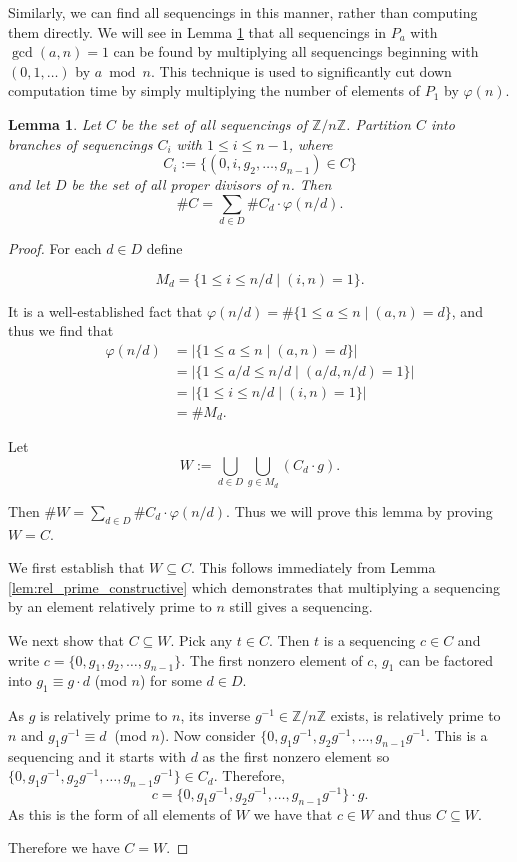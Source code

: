 \documentclass[12pt]{article}
\theoremstyle{plain}
\newtheorem{lemma}[theorem]{Lemma}
\theoremstyle{definition}
\theoremstyle{remark}
\newcommand{\ZZ}{\mathbb{Z}}
\begin{document}
Similarly, we can find all sequencings in this manner, rather than computing them directly. We will see in Lemma \ref{lem:branch} that all sequencings in $P_a$ with $\gcd(a,n)=1$ can be found by multiplying all sequencings beginning with $(0,1,\ldots)$ by $a\bmod{n}$. This technique is used to significantly cut down computation time by simply multiplying the number of elements of $P_1$ by $\varphi(n)$.

\begin{lemma}\label{lem:branch}
Let $C$ be the set of all sequencings of $\ZZ / n\ZZ$. Partition $C$ into branches of sequencings $C_i$ with $1\leq i\leq n-1$, where
\[C_i:= \{(0,i,g_2,\ldots,g_{n-1})\in C \}\]
and let $D$ be the set of all proper divisors of $n$. Then \[\#C = \sum_{d\in D}\#C_d\cdot \varphi(n/d).\]
\end{lemma}


\begin{proof}

For each $d\in D$ define

\[
M_d = \{1 \leq i \leq n/d \mid (i,n)=1\}.
\]

It is a well-established fact that $\varphi(n/d) = \#\{1 \leq a \leq n \mid (a,n)=d\}$, and thus we find that
\begin{align*}
\varphi(n/d) &= \lvert\{1 \leq a \leq n \mid (a,n)=d\}\rvert \\
&=  \lvert  \{ 1 \leq a/d \leq n/d \mid (a/d,n/d)=1\}\rvert \\
&= \lvert \{1 \leq i \leq n/d \mid (i,n)=1\}\rvert \\
&=\# M_d.
\end{align*}


Let \[W:=\bigcup_{d\in D} \bigcup_{g\in M_d} (C_d \cdot g).\]

Then $\#W=\sum_{d\in D}\#C_d\cdot \varphi(n/d)$. Thus we will prove this lemma by proving $W=C$.

We first establish that $W\subseteq C$. This follows immediately from Lemma \ref{lem:rel_prime_constructive} which demonstrates that multiplying a sequencing by an element relatively prime to $n$ still gives a sequencing. 

We next show that $C\subseteq W$. Pick any $t\in C$. Then $t$ is a sequencing $c\in C$ and write $c=\{0,g_1,g_2,\ldots,g_{n-1}\}.$ The first nonzero element of $c$, $g_1$ can be factored into $g_1\equiv g\cdot d$ (mod $n$) for some $d\in D$. 

As $g$ is relatively prime to $n$, its inverse $g^{-1}\in\ZZ/n\ZZ$ exists, is relatively prime to $n$ and $g_1g^{-1}\equiv d\ $ (mod $n$). Now consider
$\{0,g_1g^{-1},g_2g^{-1},\ldots,g_{n-1}g^{-1}$.
This  is a sequencing and it starts with $d$ as the first nonzero element so $\{0,g_1g^{-1},g_2g^{-1},\ldots,g_{n-1}g^{-1}\}\in C_d$. Therefore, \[c=\{0,g_1g^{-1},g_2g^{-1},\ldots,g_{n-1}g^{-1}\}\cdot g.\] As this is the form of all elements of $W$ we have that $c\in W$ and thus $C\subseteq W$.

Therefore we have $C=W$.

\end{proof}
\end{document}
